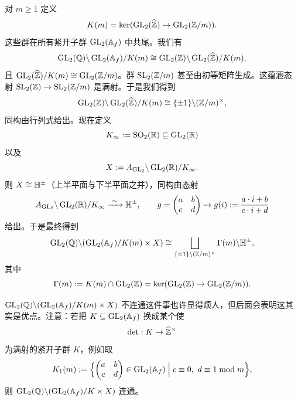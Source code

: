 对 $m\ge1$ 定义
\[
K(m)=\ker(\GL_2(\widehat\Z)\to\GL_2(\Z/m)).
\]
这些群在所有紧开子群 $\GL_2(\Af)$ 中共尾。我们有
\[
\GL_2(\Q)\backslash\GL_2(\Af)/K(m)\cong\GL_2(\Z)\backslash\GL_2(\widehat\Z)/K(m),
\]
且 $\GL_2(\widehat\Z)/K(m)\cong\GL_2(\Z/m)$。群 $\SL_2(\Z/m)$ 甚至由初等矩阵生成。这蕴涵态射 $\SL_2(\Z)\to\SL_2(\Z/m)$ 是满射。于是我们得到
\[
\GL_2(\Z)\backslash\GL_2(\widehat\Z)/K(m)\cong\{\pm1\}\backslash(\Z/m)^\times,
\]
同构由行列式给出。现在定义
\[
K_\infty:=\SO_2(\R)\subseteq\GL_2(\R)
\]
以及
\[
X:=A_{\GL_2}\backslash\GL_2(\R)/K_\infty.
\]
则 $X\cong\HH^\pm$（上半平面与下半平面之并），同构由态射
\[
A_{\GL_2}\backslash\GL_2(\R)/K_\infty\xrightarrow{\ \sim\ }\HH^\pm,\qquad
g=\begin{pmatrix}a&b\\c&d\end{pmatrix}\mapsto g(i):=\frac{a\cdot i+b}{c\cdot i+d}
\]
给出。于是最终得到
\[
\GL_2(\Q)\backslash(\GL_2(\Af)/K(m)\times X)\cong\bigsqcup_{\{\pm1\}\backslash(\Z/m)^\times}\Gamma(m)\backslash\HH^\pm,
\]
其中
\[
\Gamma(m):=K(m)\cap\GL_2(\Z)=\ker(\GL_2(\Z)\to\GL_2(\Z/m)).
\]

$\GL_2(\Q)\backslash(\GL_2(\Af)/K(m)\times X)$ 不连通这件事也许显得烦人，但后面会表明这其实是优点。注意：若把 $K\subseteq\GL_2(\Af)$ 换成某个使
\[
\det:K\to\widehat\Z^\times
\]
为满射的紧开子群 $K$，例如取
\[
K_1(m):=\Bigl\{\begin{pmatrix}a&b\\c&d\end{pmatrix}\in\GL_2(\Af)\Bigm| c\equiv0,\ d\equiv1\bmod m\Bigr\},
\]
则 $\GL_2(\Q)\backslash(\GL_2(\Af)/K\times X)$ 连通。

